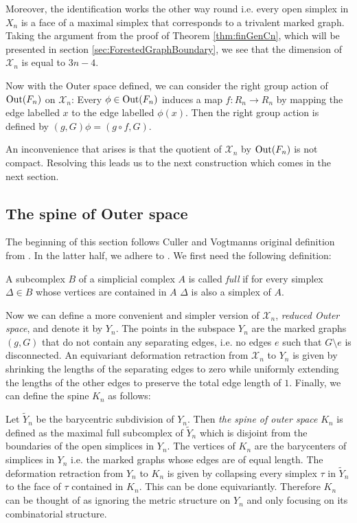 Moreover, the identification works the other way round i.e. every open simplex in $X_{n}$ 
is a face of a maximal simplex that corresponds to a trivalent marked graph.
Taking the argument from the proof of Theorem \ref{thm:finGenCn}, which will be presented in section \ref{sec:ForestedGraphBoundary}, 
we see that the dimension of $\mathcal{X}_{n}$ is equal to $3n -4$.

Now with the Outer space defined, we can consider the right group action of $\operatorname{Out}(F_{n})$ on $\mathcal{X}_{n}$:
Every $\phi \in \operatorname{Out}(F_{n})$ induces a map $f: R_{n} \to R_{n}$ by mapping the edge labelled
$x$ to the edge labelled $\phi(x)$.
Then the right group action is defined by $(g,G) \phi = (g \circ f, G)$.

An inconvenience that arises is that the quotient of $\mathcal{X}_{n}$ by $\operatorname{Out}(F_{n})$ is not compact.
Resolving this leads us to the next construction which comes in the next section.

\subsection{The spine of Outer space}\label{sec:spine}
The beginning of this section follows Culler and Vogtmanns original definition from \cite{vogtmann86}.
In the latter half, we adhere to \cite{vogtmann16}. We first need the following definition:
\begin{definition}
	A subcomplex $B$ of a simplicial complex $A$ is called \emph{full} if for every simplex $\Delta \in B$ whose vertices are contained in $A$ $\Delta$ is also a simplex of $A$.
\end{definition}
Now we can define a more convenient and simpler version of $\mathcal{X}_{n}$, \emph{reduced Outer space}, and denote it by $Y_{n}$.
The points in the subspace $Y_{n}$ are the marked graphs $(g,G)$ that do not contain any separating edges, i.e.
no edges $e$ such that $G \setminus e$ is disconnected.
An equivariant deformation retraction from $\mathcal{X}_{n}$ to $Y_{n}$ is given by shrinking the lengths of
the separating edges to zero while uniformly extending the lengths of the other edges to preserve the total edge length of $1$.
Finally, we can define the spine $K_{n}$ as follows:
\begin{definition}
	Let $\widetilde{Y}_{n}$ be the barycentric subdivision of $Y_{n}$.
	Then \emph{the spine of outer space} $K_{n}$ is defined as the maximal full subcomplex of $\widetilde{Y}_{n}$ which is disjoint from the boundaries of the open simplices in $Y_{n}$.
	The vertices of $K_{n}$ are the barycenters of simplices in $Y_{n}$ i.e. the marked graphs whose edges are of equal length.
	The deformation retraction from $Y_{n}$ to $K_{n}$ is given by
	collapsing every simplex $\tau$ in $\widetilde{Y}_{n}$ to the face of $\tau$ contained in $K_{n}$.
	This can be done equivariantly.
	Therefore $K_{n}$ can be thought of as ignoring the metric structure on $Y_{n}$ and only focusing on its combinatorial structure.
\end{definition}

